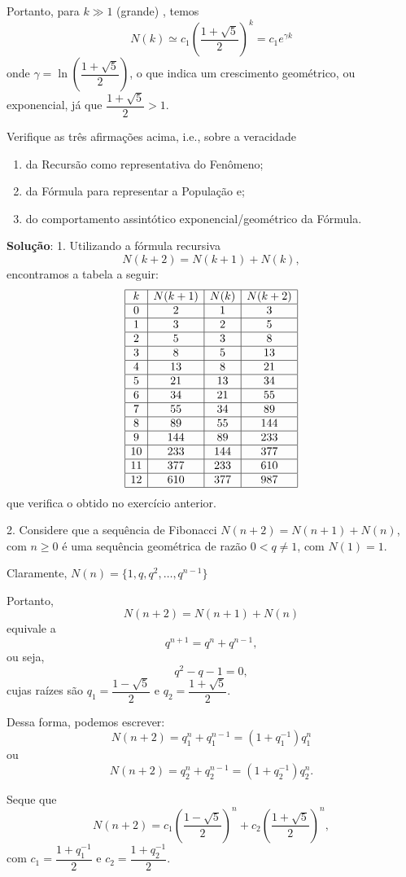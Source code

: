     Portanto, para \(k \gg 1\) (grande) , temos
    \[N(k) \simeq c_1 \left(\dfrac{1+\sqrt{5}}{2}\right)^k = c_1 e^{\gamma k}\]
    onde \(\gamma = \ln\left(\dfrac{1+\sqrt{5}}{2}\right)\), o que indica um crescimento geométrico, ou exponencial, já que \(\dfrac{1+\sqrt{5}}{2} > 1\).

\begin{exercise}
Verifique as três afirmações acima, i.e., sobre a veracidade
\begin{enumerate}
\item da Recursão como representativa do Fenômeno;
\item da Fórmula para representar a População e;
\item do comportamento assintótico exponencial/geométrico da Fórmula.
\end{enumerate}
\end{exercise}


{\color{red}
\textbf{Solução}:
1. Utilizando a fórmula recursiva
\[N(k+2) = N(k+1) + N(k),\]
encontramos a tabela a seguir:
\[\begin{array}{|c|c|c|c|} \hline
k & N(k+1) & N(k) & N(k+2) \\ \hline
0 & 2 & 1 & 3 \\ \hline
1 & 3 & 2 & 5 \\ \hline
2 & 5 & 3 & 8 \\ \hline
3 & 8 & 5 & 13 \\ \hline
4 & 13 & 8 & 21 \\ \hline
5 & 21 & 13 & 34 \\ \hline
6 & 34 & 21 & 55 \\ \hline
7 & 55 & 34 & 89 \\ \hline
8 & 89 & 55 & 144 \\ \hline
9 & 144 & 89 & 233 \\ \hline
10 & 233 & 144 & 377 \\ \hline
11 & 377 & 233 & 610 \\ \hline
12 & 610 & 377 & 987 \\ \hline
\end{array}\]
que verifica o obtido no exercício anterior.

2. Considere que a sequência de Fibonacci \(N(n+2) = N(n+1) + N(n)\), com \(n\ge 0\) é uma sequência geométrica de razão \(0 < q \ne 1\), com \(N(1) = 1\).

Claramente, \(N(n) = \{1, q, q^2, \ldots, q^{n-1}\}\)

Portanto,
\[N(n+2) = N(n+1) + N(n)\]
equivale a
\[q^{n+1} = q^{n} + q^{n-1},\]
ou seja,
\[q^2-q-1 =0,\]
cujas raízes são \(q_1 = \dfrac{1-\sqrt{5}}{2}\) e \(q_2 = \dfrac{1+\sqrt{5}}{2}\).

Dessa forma, podemos escrever:
\[N(n+2) = q_1^{n} + q_1^{n-1} = (1+q_1^{-1}) q_1^{n}\]
ou
\[N(n+2) = q_2^{n} + q_2^{n-1} = (1+q_2^{-1}) q_2^{n}.\]

Seque que
\[N(n+2) = c_1 \left(\dfrac{1-\sqrt{5}}{2}\right)^{n} + c_2 \left(\dfrac{1+\sqrt{5}}{2}\right)^{n},\]
com \(c_1 = \dfrac{1+q_1^{-1}}{2}\) e \(c_2 = \dfrac{1+q_2^{-1}}{2}\).


}


